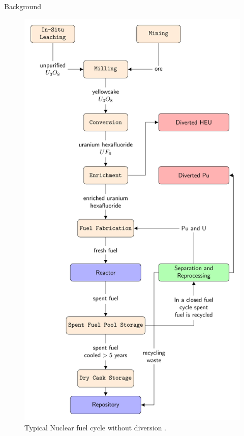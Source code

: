 \documentclass[final]{beamer}
\newlength{\onecolwid}
\newlength{\threecolwid}
\begin{document}
\begin{frame}[t]
\begin{columns}[t,totalwidth=\threecolwid]
\begin{column}{\onecolwid}
\begin{block}{Background}

\begin{figure}
	\includegraphics[width=0.9\linewidth]{fc-diagram.pdf}
	\caption{Typical Nuclear fuel cycle without diversion \cite{huff_2018}.}
\end{figure}

\end{block}



\end{column}
\end{columns}
\end{frame}
\end{document}
